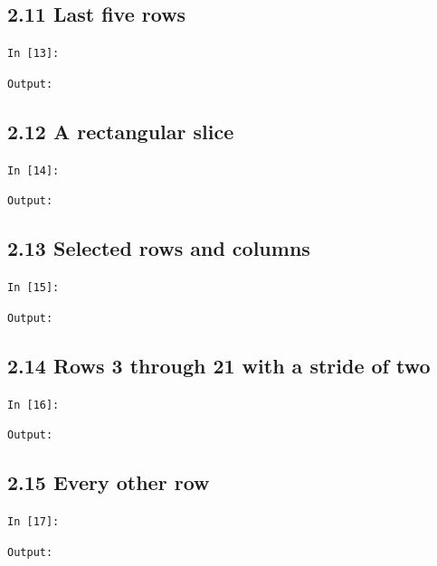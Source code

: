\documentclass[11pt]{article}
\begin{document}
\par\medskip\noindent\begin{minipage}{\linewidth}
\subsection*{2.11 Last five rows}
\noindent\texttt{In [13]:}

\noindent\texttt{Output:}

\end{minipage}\par

\par\medskip\noindent\begin{minipage}{\linewidth}
\subsection*{2.12 A rectangular slice}
\noindent\texttt{In [14]:}

\noindent\texttt{Output:}

\end{minipage}\par

\par\medskip\noindent\begin{minipage}{\linewidth}
\subsection*{2.13 Selected rows and columns}
\noindent\texttt{In [15]:}

\noindent\texttt{Output:}

\end{minipage}\par

\par\medskip\noindent\begin{minipage}{\linewidth}
\subsection*{2.14 Rows 3 through 21 with a stride of two}
\noindent\texttt{In [16]:}

\noindent\texttt{Output:}

\end{minipage}\par

\par\medskip\noindent\begin{minipage}{\linewidth}
\subsection*{2.15 Every other row}
\noindent\texttt{In [17]:}

\noindent\texttt{Output:}

\end{minipage}\par
\end{document}
